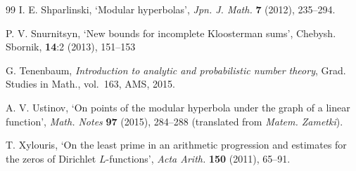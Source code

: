 \documentclass[12pt]{amsart}
\numberwithin{equation}{section}
\numberwithin{theorem}{section}
\numberwithin{table}{section}
\numberwithin{figure}{section}
\begin{document}
\begin{thebibliography}{99}
 I. E. Shparlinski, `Modular hyperbolas',
{\it Jpn. J. Math.\/} {\bf 7} (2012),  235--294.

 P. V. Snurnitsyn, `New bounds for incomplete Kloosterman sums', Chebysh. Sbornik, {\bf 14}:2 (2013), 151--153

 G. Tenenbaum,
{\it Introduction to analytic and probabilistic number theory\/},
Grad. Studies in Math.,  vol.~163, AMS, 2015.

 A. V. Ustinov, `On points of the modular hyperbola under the graph of a linear function',  
  {\it Math. Notes\/}  {\bf 97} (2015), 284--288 
  (translated from {\it Matem. Zametki\/}). 

 T. Xylouris,
`On the least prime in an arithmetic progression and estimates for the zeros of Dirichlet $L$-functions',
{\it Acta Arith.\/} {\bf 150} (2011),   65--91.


\end{thebibliography}
\end{document}
